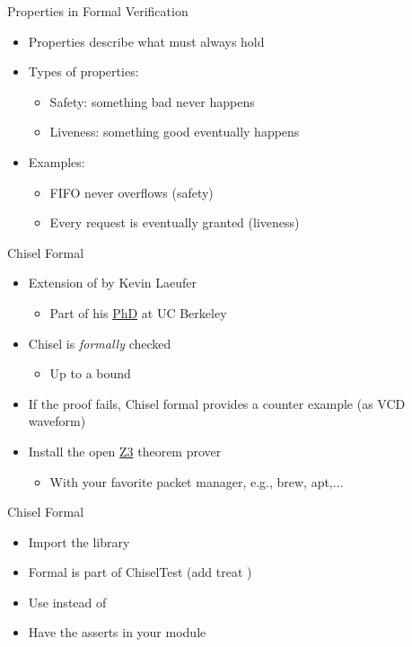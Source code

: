 \begin{frame}{Properties in Formal Verification}
\begin{itemize}
    \item Properties describe what must always hold
    \item Types of properties:
    \begin{itemize}
        \item Safety: something bad never happens
        \item Liveness: something good eventually happens
    \end{itemize}
    \item Examples:
    \begin{itemize}
        \item FIFO never overflows (safety)
        \item Every request is eventually granted (liveness)
    \end{itemize}
\end{itemize}
\end{frame}


\begin{frame}[fragile]{Chisel Formal}
\begin{itemize}
\item Extension of  by Kevin Laeufer
\begin{itemize}
\item Part of his \href{https://www2.eecs.berkeley.edu/Pubs/TechRpts/2024/EECS-2024-157.pdf}{PhD} at UC Berkeley
\end{itemize}
\item Chisel  is \emph{formally} checked
\begin{itemize}
\item Up to a bound
\end{itemize}
\item If the proof fails, Chisel formal provides a counter example (as VCD waveform)
\item Install the open \href{https://github.com/Z3Prover/z3}{Z3} theorem prover
\begin{itemize}
\item With your favorite packet manager, e.g., brew, apt,...
\end{itemize}
\end{itemize}
\end{frame}

\begin{frame}[fragile]{Chisel Formal}
\begin{itemize}
\item Import the library
\item Formal is part of ChiselTest (add treat )
\item Use  instead of 
\item Have the asserts in your module
\end{itemize}
\end{frame}

